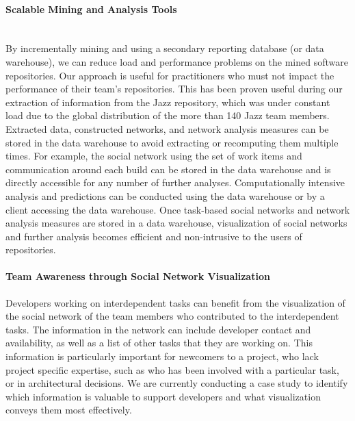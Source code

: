 \paragraph{Scalable Mining and Analysis Tools}
\ \\
By incrementally mining and using a secondary reporting database (or data
warehouse), we can reduce load and performance problems on the mined software
repositories. Our approach is useful for practitioners who must not impact the
performance of their team's repositories.
This has been proven useful during our extraction of information from the Jazz
repository, which was under constant load due to the global distribution of the
more than 140 Jazz team members.
%
Extracted data, constructed networks, and network analysis measures can be stored
in the data warehouse to avoid extracting or recomputing them multiple times. For
example, the social network using the set of work items and communication around
each build can be stored in the data warehouse and is directly accessible for any
number of further analyses. Computationally intensive analysis and predictions
can be conducted using the data warehouse or by a client accessing the data
warehouse. Once task-based social networks and network analysis measures are
stored in a data warehouse, visualization of social networks and further analysis
becomes efficient and non-intrusive to the users of repositories.


\paragraph{Team Awareness through Social Network Visualization}
Developers working on interdependent tasks can benefit from the visualization of
the social network of the team members who contributed to the interdependent
tasks. The information in the network can include developer contact and
availability, as well as a list of other tasks that they are working on. This
information is particularly important for newcomers to a project, who lack
project specific expertise, such as who has been involved with a particular task,
or in architectural decisions.
We are currently conducting a case study to identify which information is
valuable to support developers and what visualization conveys them most
effectively.
 



